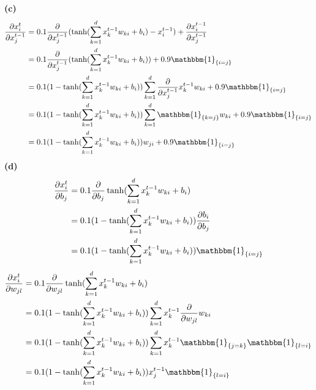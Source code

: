 \documentclass[a4paper]{article}
\newcommand{\1}{\mathds{1}}
\begin{document}
\textbf{(c)}\\
\begin{align*}
\frac{\partial x^t_i}{\partial x^{t-1}_j}
&=0.1\frac{\partial}{\partial x^{t-1}_j}(\tanh(\sum_{k=1}^{d}x^{t-1}_k w_{ki}+b_i)-x^{t-1}_i)+\frac{\partial x^{t-1}_i}{\partial x^{t-1}_j}\\
&=0.1\frac{\partial}{\partial x^{t-1}_j}(\tanh(\sum_{k=1}^{d}x^{t-1}_k w_{ki}+b_i))+0.9\mathbbm{1}_{\{i=j\}}\\
&=0.1(1-\tanh(\sum_{k=1}^{d}x^{t-1}_k w_{ki}+b_i))\sum_{k=1}^{d}\frac{\partial}{\partial x^{t-1}_j}x^{t-1}_k w_{ki}+0.9\mathbbm{1}_{\{i=j\}}\\
&=0.1(1-\tanh(\sum_{k=1}^{d}x^{t-1}_k w_{ki}+b_i))\sum_{k=1}^{d}\mathbbm{1}_{\{k=j\}} w_{ki}+0.9\mathbbm{1}_{\{i=j\}}\\
&=0.1(1-\tanh(\sum_{k=1}^{d}x^{t-1}_k w_{ki}+b_i))w_{ji}+0.9\mathbbm{1}_{\{i=j\}}\\
\end{align*}
\textbf{(d)}\\
\begin{align*}
\frac{\partial x^t_i}{\partial b_j}
&=0.1\frac{\partial}{\partial b_j}\tanh(\sum_{k=1}^{d}x^{t-1}_k w_{ki}+b_i)\\
&=0.1(1-\tanh(\sum_{k=1}^{d}x^{t-1}_k w_{ki}+b_i))\frac{\partial b_i}{\partial b_j}\\
&=0.1(1-\tanh(\sum_{k=1}^{d}x^{t-1}_k w_{ki}+b_i))\mathbbm{1}_{\{i=j\}}\\
\end{align*}
\begin{align*}
\frac{\partial x^t_i}{\partial w_{jl}}
&=0.1\frac{\partial}{\partial w_{jl}}\tanh(\sum_{k=1}^{d}x^{t-1}_k w_{ki}+b_i)\\
&=0.1(1-\tanh(\sum_{k=1}^{d}x^{t-1}_k w_{ki}+b_i))\sum_{k=1}^{d}x^{t-1}_k\frac{\partial}{\partial w_{jl}}w_{ki}\\
&=0.1(1-\tanh(\sum_{k=1}^{d}x^{t-1}_k w_{ki}+b_i))\sum_{k=1}^{d}x^{t-1}_k\mathbbm{1}_{\{j=k\}}\mathbbm{1}_{\{l=i\}}\\
&=0.1(1-\tanh(\sum_{k=1}^{d}x^{t-1}_k w_{ki}+b_i))x^{t-1}_j\mathbbm{1}_{\{l=i\}}\\
\end{align*}
\end{document}
